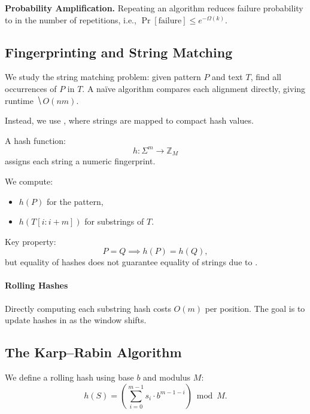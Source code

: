 \documentclass[11pt]{exam}
\begin{document}
\vspace{0.5in}

\textbf{Probability Amplification.}
Repeating an algorithm reduces failure probability to  in the number of repetitions, i.e., $\Pr[\text{failure}] \le e^{-\Omega(k)}$.

\vspace{1em}

\subsection{Fingerprinting and String Matching}

We study the string matching problem: given pattern $P$ and text $T$, find all occurrences of $P$ in $T$. 
A na\"{i}ve algorithm compares each alignment directly, giving runtime $\hide{O(nm)}$.

\vspace{1em}

Instead, we use , where strings are mapped to compact hash values.

A hash function:
\[
h: \Sigma^m \to \mathbb{Z}_M
\]
assigns each string a numeric fingerprint.

We compute:
\begin{itemize}
    \item $h(P)$ for the pattern,
    \item $h(T[i:i+m])$ for substrings of $T$.
\end{itemize}

\vspace{0.5em}

Key property:
\[
P = Q \implies h(P) = h(Q),
\]
but equality of hashes does not guarantee equality of strings due to .

\paragraph{Rolling Hashes}

Directly computing each substring hash costs $O(m)$ per position. The goal is to update hashes in  as the window shifts.

\newpage

\subsection{The Karp--Rabin Algorithm}

We define a rolling hash using base $b$ and modulus $M$:
\[
h(S) = \left(\sum_{i=0}^{m-1} s_i \cdot b^{m-1-i}\right) \bmod M.
\]
\end{document}
